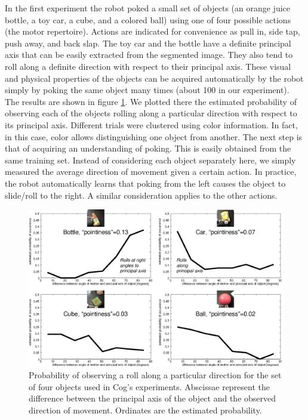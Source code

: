 In the first experiment the robot poked a small set of objects 
(an orange juice bottle, a toy car, a cube, and a colored ball) using 
one of four possible actions (the motor repertoire). Actions are 
indicated for convenience as pull in, side tap, push away, and back 
slap. The toy car and the bottle have a definite principal axis that 
can be easily extracted from the segmented image. They also tend to 
roll along a definite direction with respect to their principal axis. 
These visual and physical properties of the objects can be acquired 
automatically by the robot simply by poking the same object many times 
(about 100 in our experiment). The results are shown in figure 
\ref{fig:affordances}. We plotted there the estimated probability 
of observing each of the objects rolling along a particular direction 
with respect to its principal axis. Different trials were clustered 
using color information. In fact, in this case, color allows 
distinguishing one object from another. The next step is that of 
acquiring an understanding of poking. This is easily obtained from 
the same training set. Instead of considering each object separately 
here, we simply measured the average direction of movement given a 
certain action. In practice, the robot automatically learns that 
poking from the left causes the object to slide/roll to the right. 
A similar consideration applies to the other actions.

%
%
\begin{figure}[tb]
\begin{center}
\includegraphics[width=\columnwidth]{affordances.eps}
\caption{ 
\label{fig:affordances}
%
%
Probability of observing a roll along a particular direction for the set of
four objects used in Cog's experiments. Abscissae represent the difference
between the principal axis of the object and the observed direction of movement.
Ordinates are the estimated probability.
}
\end{center}
\end{figure}
%
%


